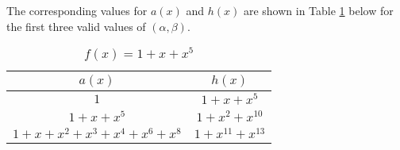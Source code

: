 \begin{example}
The corresponding values for $a(x)$ and $h(x)$ are shown in Table \ref{novelTab8-b} below for the first three valid values of $(\alpha,\beta)$.
\begin{table}[htbp]
 \caption{$f(x)=1+x+x^5$}
\centering
 \begin{tabular}{c c} 
 \hline
 $a(x)$ & $h(x)$\\ [0.5ex] 
 \hline\hline
$1$ & $1+x+x^{5}$\\ 
\hline
$1+x+x^5$ &  $1+x^2+x^{10}$\\
\hline
$1+x+x^2+x^3+x^4+x^{6}+x^{8}$ & $1+x^{11}+x^{13}$\\
 \end{tabular}
 \label{novelTab8-b}
\end{table}

\end{example}
 







